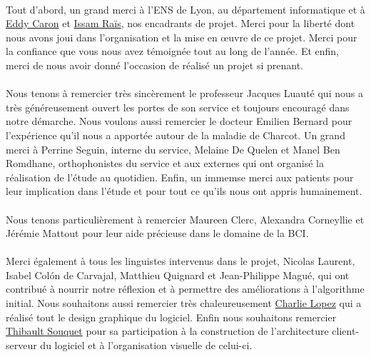 \documentclass[11pt,a4paper]{article}
\theoremstyle{plain}
\theoremstyle{definition}
\begin{document}
\paragraph{}Tout d'abord, un grand merci à l'ENS de Lyon, au département informatique et à \href{http://graal.ens-lyon.fr/~ecaron/}{Eddy Caron} et \href{http://perso.ens-lyon.fr/issam.rais/}{Issam Raïs}, nos encadrants de projet. Merci pour la liberté dont nous avons joui dans l'organisation et la mise en \oe uvre de ce projet. Merci pour la confiance que vous nous avez témoignée tout au long de l'année.
Et enfin, merci de nous avoir donné l'occasion de réalisé un projet si prenant.

\paragraph{}
Nous tenons à remercier très sincèrement le professeur Jacques Luauté qui nous a très généreusement ouvert les portes de son service et toujours encouragé dans notre démarche.
Nous voulons aussi remercier le docteur Emilien Bernard pour l'expérience qu'il nous a apportée autour de la maladie de Charcot. Un grand merci à Perrine Seguin, interne 
du service, Melaine De Quelen et Manel Ben Romdhane, orthophonistes du service et aux externes qui ont organisé la réalisation de l'étude au quotidien. Enfin, un immemse merci
aux patients pour leur implication dans l'étude et pour tout ce qu'ils nous ont appris humainement.

\paragraph{}
Nous tenons particulièrement à remercier Maureen Clerc, Alexandra Corneyllie et Jérémie Mattout pour leur aide précieuse dans le domaine de la BCI.

\paragraph{}
Merci également à tous les linguistes intervenus dans le projet, Nicolas Laurent, Isabel Colón de Carvajal, Matthieu Quignard et Jean-Philippe Magué, qui ont contribué à nourrir notre réflexion et à permettre 
des améliorations à l'algorithme initial. Nous souhaitons aussi remercier très chaleureusement \href{http://www.charlie-lopez.com/}{Charlie Lopez} 
qui a réalisé tout le design graphique du logiciel. Enfin nous souhaitons remercier \href{http://thibaultsouquet.fr/}{Thibault Souquet} pour sa participation à la construction 
de l'architecture client-serveur du logiciel et à l'organisation visuelle de celui-ci.
\end{document}
